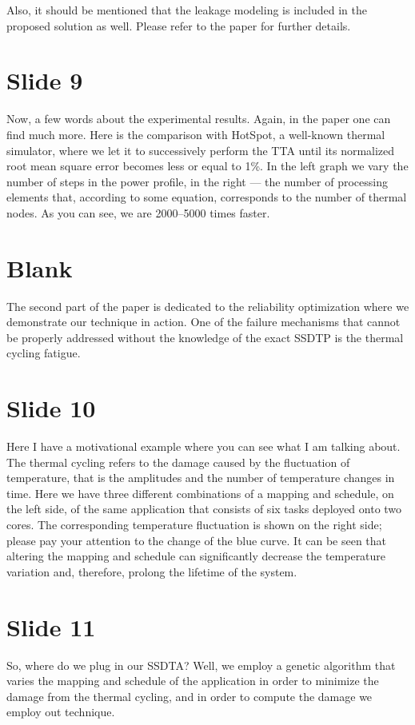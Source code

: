 \documentclass[11pt,a4paper]{article}
\begin{document}
Also, it should be mentioned that the leakage modeling is included in the proposed solution as well. Please refer to the paper for further details.

\section{Slide 9}
Now, a few words about the experimental results. Again, in the paper one can find much more. Here is the comparison with HotSpot, a well-known thermal simulator, where we let it to successively perform the TTA until its normalized root mean square error becomes less or equal to 1\%. In the left graph we vary the number of steps in the power profile, in the right --- the number of processing elements that, according to some equation, corresponds to the number of thermal nodes. As you can see, we are 2000--5000 times faster.

\section{Blank}
The second part of the paper is dedicated to the reliability optimization where we demonstrate our technique in action. One of the failure mechanisms that cannot be properly addressed without the knowledge of the exact SSDTP is the thermal cycling fatigue.

\section{Slide 10}
Here I have a motivational example where you can see what I am talking about. The thermal cycling refers to the damage caused by the fluctuation of temperature, that is the amplitudes and the number of temperature changes in time. Here we have three different combinations of a mapping and schedule, on the left side, of the same application that consists of six tasks deployed onto two cores. The corresponding temperature fluctuation is shown on the right side; please pay your attention to the change of the blue curve. It can be seen that altering the mapping and schedule can significantly decrease the temperature variation and, therefore, prolong the lifetime of the system.

\section{Slide 11}
So, where do we plug in our SSDTA? Well, we employ a genetic algorithm that varies the mapping and schedule of the application in order to minimize the damage from the thermal cycling, and in order to compute the damage we employ out technique.
\end{document}
